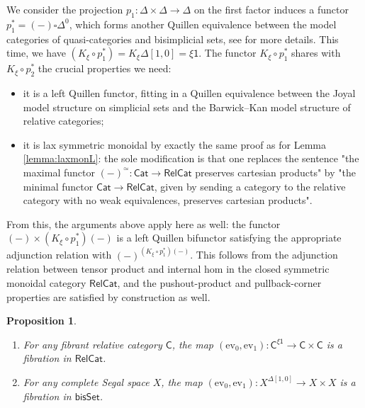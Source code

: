 \documentclass{proc-l}
\theoremstyle{plain}
\newtheorem{proposition}[{theorem}]{Proposition}
\theoremstyle{definition}
\theoremstyle{remark}
\begin{document}
We consider the projection $p_1:\Delta\times\Delta\rightarrow\Delta$ on the first factor induces a functor $p_1^*=(-)\square\Delta^0$, which forms another Quillen equivalence between the model categories of quasi-categories and bisimplicial sets, see \cite{JoaylTierney07} for more details. This time, we have $(K_{\xi}\circ p_1^*)=K_{\xi}\Delta[1,0] = \xi\mathsf{1}$. The functor $K_{\xi}\circ p_1^*$ shares with $K_{\xi}\circ p_2^*$ the crucial properties we need:
\begin{itemize}[label=$\bullet$]
\item it is a left Quillen functor, fitting in a Quillen equivalence between the Joyal model structure on simplicial sets and the Barwick--Kan model structure of relative categories;

\item it is lax symmetric monoidal by exactly the same proof as for Lemma \ref{lemma:laxmonL}: the sole modification is that one replaces the sentence "the maximal functor $(-)^{\simeq}: \mathsf{Cat} \longrightarrow \mathsf{RelCat}$ preserves cartesian products" by "the minimal functor $\mathsf{Cat} \longrightarrow \mathsf{RelCat}$, given by sending a category to the relative category with no weak equivalences, preserves cartesian products".
\end{itemize}

From this, the arguments above apply here as well: the functor $(-)\times (K_{\xi}\circ p_1^*)(-)$ is a left Quillen bifunctor satisfying the appropriate adjunction relation with $(-)^{(K_{\xi}\circ p_1^*)(-)}$. This follows from the adjunction relation between tensor product and internal hom in the closed symmetric monoidal category $\mathsf{RelCat}$, and the pushout-product and pullback-corner properties are satisfied by construction as well.

\begin{proposition}%
\label{Proposition:A.17}\label{prop: evaluationfibrations}\leavevmode
\begin{enumerate}[label=(\arabic*),start=1]
\item For any fibrant relative category $\mathsf{C}$, the map  $(\mathrm{ev}_0,\mathrm{ev}_1):\mathsf{C}^{\xi\mathsf{1}}\rightarrow \mathsf{C}\times \mathsf{C}$ is a fibration in $\mathsf{RelCat}$.

\item For any complete Segal space $X$, the map  $(\mathrm{ev}_0,\mathrm{ev}_1):X^{\Delta[1,0]}\rightarrow X\times X$ is a fibration in $\mathsf{bisSet}$.
\end{enumerate}
\end{proposition}
\end{document}
